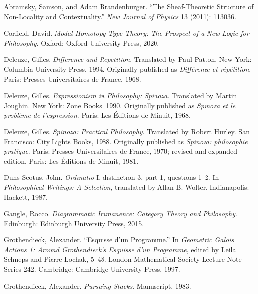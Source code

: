 \documentclass[11pt]{article}
\begin{document}
\begin{description}[leftmargin=0pt,labelwidth=0pt,itemindent=0pt,itemsep=0.55em]
\item Abramsky, Samson, and Adam Brandenburger. ``The Sheaf-Theoretic Structure
of Non-Locality and Contextuality.'' \emph{New Journal of Physics} 13 (2011):
113036.

\item Corfield, David. \emph{Modal Homotopy Type Theory: The Prospect of a New
Logic for Philosophy}. Oxford: Oxford University Press, 2020.

\item Deleuze, Gilles. \emph{Difference and Repetition}. Translated by Paul
Patton. New York: Columbia University Press, 1994. Originally published as
\emph{Différence et répétition}. Paris: Presses Universitaires de France, 1968.

\item Deleuze, Gilles. \emph{Expressionism in Philosophy: Spinoza}. Translated
by Martin Joughin. New York: Zone Books, 1990. Originally published as
\emph{Spinoza et le problème de l'expression}. Paris: Les Éditions de Minuit,
1968.

\item Deleuze, Gilles. \emph{Spinoza: Practical Philosophy}. Translated by
Robert Hurley. San Francisco: City Lights Books, 1988. Originally published as
\emph{Spinoza: philosophie pratique}. Paris: Presses Universitaires de France,
1970; revised and expanded edition, Paris: Les Éditions de Minuit, 1981.

\item Duns Scotus, John. \emph{Ordinatio} I, distinction 3, part 1, questions
1--2. In \emph{Philosophical Writings: A Selection}, translated by Allan B.
Wolter. Indianapolis: Hackett, 1987.

\item Gangle, Rocco. \emph{Diagrammatic Immanence: Category Theory and
Philosophy}. Edinburgh: Edinburgh University Press, 2015.

\item Grothendieck, Alexander. ``Esquisse d'un Programme.'' In \emph{Geometric
Galois Actions 1: Around Grothendieck's Esquisse d'un Programme}, edited by
Leila Schneps and Pierre Lochak, 5--48. London Mathematical Society Lecture Note
Series 242. Cambridge: Cambridge University Press, 1997.

\item Grothendieck, Alexander. \emph{Pursuing Stacks}. Manuscript, 1983.


\end{description}
\end{document}
